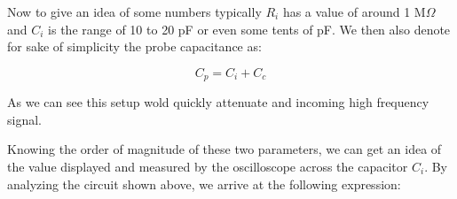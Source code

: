 \documentclass[../main.tex]{subfiles}
\begin{document}
Now to give an idea of some numbers typically $R_i$ has a value of around 1 M$\Omega$ and $C_i$ is the range of 10 to 20 pF or even some tents of pF. We then also denote for sake of simplicity the probe capacitance as:

\begin{equation}
	C_p = C_i + C_c
\end{equation} 

As we can see this setup wold quickly attenuate and incoming high frequency signal.


%
%
%
%
%
%
%


Knowing the order of magnitude of these two parameters, we can get an idea of the value displayed and measured by the oscilloscope across the capacitor $C_i$.
By analyzing the circuit shown above, we arrive at the following expression:
\end{document}

